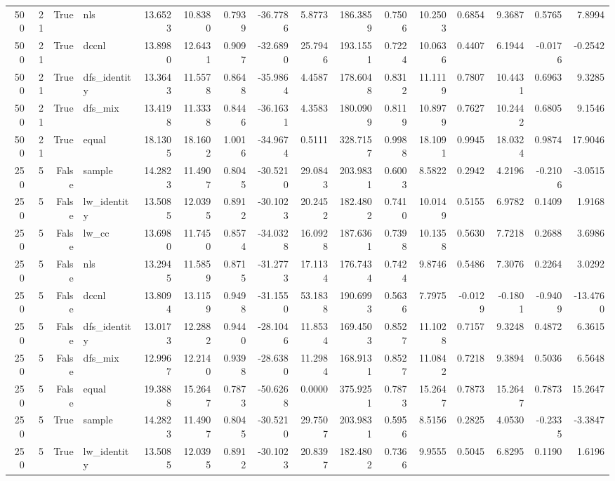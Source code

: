 \begin{tabular}{rrrlrrrrrrrrrrrr}
500 & 21 & True & nls & 13.6523 & 10.8380 & 0.7939 & -36.7786 & 5.8773 & 186.3859 & 0.7506 & 10.2503 & 0.6854 & 9.3687 & 0.5765 & 7.8994 \\
500 & 21 & True & dccnl & 13.8980 & 12.6431 & 0.9097 & -32.6890 & 25.7946 & 193.1551 & 0.7224 & 10.0636 & 0.4407 & 6.1944 & -0.0176 & -0.2542 \\
500 & 21 & True & dfs_identity & 13.3643 & 11.5578 & 0.8648 & -35.9864 & 4.4587 & 178.6048 & 0.8312 & 11.1119 & 0.7807 & 10.4431 & 0.6963 & 9.3285 \\
500 & 21 & True & dfs_mix & 13.4198 & 11.3338 & 0.8446 & -36.1631 & 4.3583 & 180.0909 & 0.8119 & 10.8979 & 0.7627 & 10.2442 & 0.6805 & 9.1546 \\
500 & 21 & True & equal & 18.1305 & 18.1602 & 1.0016 & -34.9674 & 0.5111 & 328.7157 & 0.9988 & 18.1091 & 0.9945 & 18.0324 & 0.9874 & 17.9046 \\
250 & 5 & False & sample & 14.2823 & 11.4907 & 0.8045 & -30.5210 & 29.0843 & 203.9831 & 0.6003 & 8.5822 & 0.2942 & 4.2196 & -0.2106 & -3.0515 \\
250 & 5 & False & lw_identity & 13.5085 & 12.0395 & 0.8912 & -30.1023 & 20.2452 & 182.4802 & 0.7410 & 10.0149 & 0.5155 & 6.9782 & 0.1409 & 1.9168 \\
250 & 5 & False & lw_cc & 13.6980 & 11.7450 & 0.8574 & -34.0328 & 16.0928 & 187.6361 & 0.7398 & 10.1358 & 0.5630 & 7.7218 & 0.2688 & 3.6986 \\
250 & 5 & False & nls & 13.2945 & 11.5859 & 0.8715 & -31.2773 & 17.1134 & 176.7434 & 0.7424 & 9.8746 & 0.5486 & 7.3076 & 0.2264 & 3.0292 \\
250 & 5 & False & dccnl & 13.8094 & 13.1159 & 0.9498 & -31.1550 & 53.1838 & 190.6993 & 0.5636 & 7.7975 & -0.0129 & -0.1801 & -0.9409 & -13.4760 \\
250 & 5 & False & dfs_identity & 13.0173 & 12.2882 & 0.9440 & -28.1046 & 11.8534 & 169.4503 & 0.8527 & 11.1028 & 0.7157 & 9.3248 & 0.4872 & 6.3615 \\
250 & 5 & False & dfs_mix & 12.9967 & 12.2140 & 0.9398 & -28.6380 & 11.2984 & 168.9131 & 0.8527 & 11.0842 & 0.7218 & 9.3894 & 0.5036 & 6.5648 \\
250 & 5 & False & equal & 19.3888 & 15.2647 & 0.7873 & -50.6268 & 0.0000 & 375.9251 & 0.7873 & 15.2647 & 0.7873 & 15.2647 & 0.7873 & 15.2647 \\
250 & 5 & True & sample & 14.2823 & 11.4907 & 0.8045 & -30.5210 & 29.7507 & 203.9831 & 0.5956 & 8.5156 & 0.2825 & 4.0530 & -0.2335 & -3.3847 \\
250 & 5 & True & lw_identity & 13.5085 & 12.0395 & 0.8912 & -30.1023 & 20.8397 & 182.4802 & 0.7366 & 9.9555 & 0.5045 & 6.8295 & 0.1190 & 1.6196 \\

\end{tabular}
